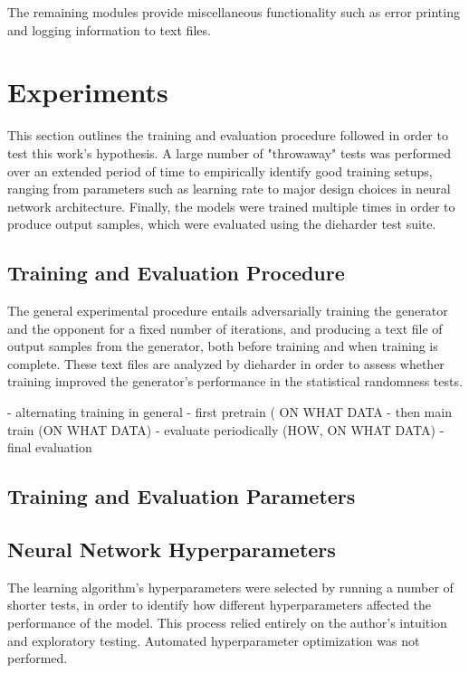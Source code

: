 \documentclass[12pt, titlepage]{report}
\theoremstyle{definition}
\begin{document}
The remaining modules provide miscellaneous functionality such as error printing and logging information to text files.


\chapter{Experiments}\label{chapter:experiments}
This section outlines the training and evaluation procedure followed in order to test this work's hypothesis. A large number of "throwaway" tests was performed over an extended period of time to empirically identify good training setups, ranging from parameters such as learning rate to major design choices in neural network architecture. Finally, the models were trained multiple times in order to produce output samples, which were evaluated using the dieharder test suite.


\section{Training and Evaluation Procedure}
The general experimental procedure entails adversarially training the generator and the opponent for a fixed number of iterations, and producing a text file of output samples from the generator, both before training and when training is complete. These text files are analyzed by dieharder in order to assess whether training improved the generator's performance in the statistical randomness tests.



- alternating training in general
- first pretrain ( ON WHAT DATA
- then main train (ON WHAT DATA)
- evaluate periodically (HOW, ON WHAT DATA)
- final evaluation

\section{Training and Evaluation Parameters}


\section{Neural Network Hyperparameters}
The learning algorithm's hyperparameters were selected by running a number of shorter tests, in order to identify how different hyperparameters affected the performance of the model. This process relied entirely on the author's intuition and exploratory testing. Automated hyperparameter optimization was not performed.
\end{document}

